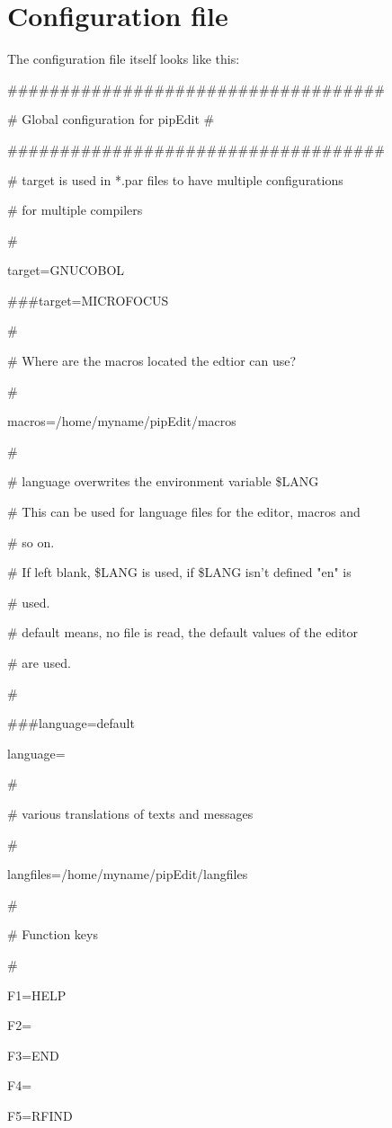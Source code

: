 \documentclass{report}
\begin{document}
\section{Configuration file}

The configuration file itself looks like this:

\#\#\#\#\#\#\#\#\#\#\#\#\#\#\#\#\#\#\#\#\#\#\#\#\#\#\#\#\#\#\#\#\#\#\#\#

\# Global configuration for pipEdit \#

\#\#\#\#\#\#\#\#\#\#\#\#\#\#\#\#\#\#\#\#\#\#\#\#\#\#\#\#\#\#\#\#\#\#\#\#

\# target is used in *.par files to have multiple configurations  

\# for multiple compilers

\#

target=GNUCOBOL

\#\#\#target=MICROFOCUS

\#

\# Where are the macros located the edtior can use?

\#

macros=/home/myname/pipEdit/macros

\#

\# language overwrites the environment variable \$LANG

\# This can be used for language files for the editor, macros and 

\# so on.

\# If left blank, \$LANG is used, if \$LANG isn't defined "en" is

\# used.

\# default means, no file is read, the default values of the editor

\# are used.

\#

\#\#\#language=default

language=

\#

\# various translations of texts and messages

\#

langfiles=/home/myname/pipEdit/langfiles

\#

\# Function keys

\#

F1=HELP

F2=

F3=END

F4=

F5=RFIND
\end{document}
